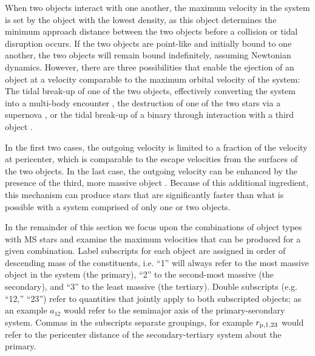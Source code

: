 \documentclass[a4paper,twocolumn]{emulateapj}
\begin{document}
{When two objects interact with one another, the maximum velocity in the system is set by the object with the lowest density, as this object determines the minimum approach distance between the two objects before a collision or tidal disruption occurs. If the two objects are point-like and initially bound to one another, the two objects will remain bound indefinitely, assuming Newtonian dynamics. However, there are three possibilities that enable the ejection of an object at a velocity comparable to the maximum orbital velocity of the system: The tidal break-up of one of the two objects, effectively converting the system into a multi-body encounter \citep{Faber:2005a,Manukian:2013a}, the destruction of one of the two stars via a supernova \citep[runaway stars,][]{Blaauw:1961a}, or the tidal break-up of a binary through interaction with a third object \citep{Hills:1988a,Agnor:2006a,Hoffman:2007a}.

In the first two cases, the outgoing velocity is limited to a fraction of the velocity at pericenter, which is comparable to the escape velocities from the surfaces of the two objects. In the last case, the outgoing velocity can be enhanced by the presence of the third, more massive object \citep{Hills:1988a}. Because of this additional ingredient, this mechanism can produce stars that are significantly faster than what is possible with a system comprised of only one or two objects.

In the remainder of this section we focus upon the combinations of object types with MS stars and examine the maximum velocities that can be produced for a given combination. Label subscripts for each object are assigned in order of descending mass of the constituents, i.e. ``1'' will always refer to the most massive object in the system (the primary), ``2'' to the second-most massive (the secondary), and ``3'' to the least massive (the tertiary). Double subscripts (e.g. ``12,'' ``23'') refer to quantities that jointly apply to both subscripted objects; as an example $a_{12}$ would refer to the semimajor axis of the primary-secondary system. Commas in the subscripts separate groupings, for example $r_{\rm p,1,23}$ would refer to the pericenter distance of the secondary-tertiary system about the primary.

}
\end{document}
